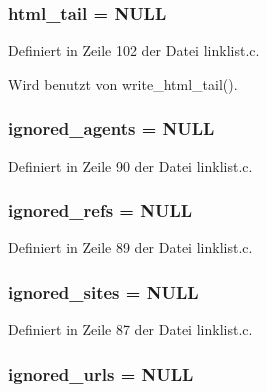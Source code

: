 \subsubsection{ {\bf html\_\-tail} = NULL}\label{linklist_8c_7d3b981f0cda9084a93c191ab80637da}




Definiert in Zeile 102 der Datei linklist.c.

Wird benutzt von write\_\-html\_\-tail().
\subsubsection{ {\bf ignored\_\-agents} = NULL}\label{linklist_8c_60013ce10d008e9eb74a4b6f28959729}




Definiert in Zeile 90 der Datei linklist.c.
\subsubsection{ {\bf ignored\_\-refs} = NULL}\label{linklist_8c_761639dc29cca53d524007b9fb4a6e65}




Definiert in Zeile 89 der Datei linklist.c.
\subsubsection{ {\bf ignored\_\-sites} = NULL}\label{linklist_8c_9df089ae5b8931353b2e79b9a33c70e6}




Definiert in Zeile 87 der Datei linklist.c.
\subsubsection{ {\bf ignored\_\-urls} = NULL}\label{linklist_8c_9a30b4cfe3e814caad5864bf70683264}




